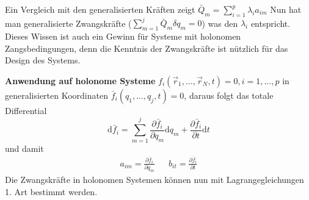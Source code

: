 \documentclass[oneside]{book}
\theoremstyle{definition}
\renewcommand{\d}{\mathrm d}
\newcommand{\ffpartial}[2]{\frac{\partial #1}{\partial #2}}
\newcommand{\vardots}[2]{#1_1, \dots, #1_#2}
\begin{document}
Ein Vergleich mit den generalisierten Kräften zeigt $\bar{Q}_m = \sum_{i=1}^{p} \lambda_i a_{im}$
Nun hat man generalisierte Zwangskräfte ($\sum_{m=1}^j \bar{Q}_m \delta q_m = 0$) was den $\lambda_i$ entspricht.
Dieses Wissen ist auch ein Gewinn für Systeme mit holonomen Zangsbedingungen, denn die Kenntnis der Zwangskräfte ist nützlich für das Design des Systems.

\textbf{Anwendung auf holonome Systeme}
$f_i(\vardots{\vec{r}}{N}, t) = 0, i = 1, \dots, p$ in generalisierten Koordinaten $\bar{f}_i(\vardots{q}{j}, t) = 0$, daraus folgt das totale Differential 
$$\d \bar{f}_i = \sum_{m=1}^j \ffpartial{\bar{f}_i}{q_m} \d q_m + \ffpartial{\bar{f}_i}{t} \d t$$
und damit 
\begin{align*}
	a_{im} = \ffpartial{\bar{f}_i}{q_m}& &b_{it} = \ffpartial{\bar{f}_i}{t}
\end{align*}
Die Zwangskräfte in holonomen Systemen können nun mit Lagrangegleichungen 1. Art bestimmt werden.
\end{document}
